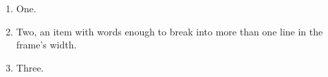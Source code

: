 \documentclass{beamer}
\begin{document}
\begin{frame}
\begin{enumerate}
\item One.
\item Two, an item with words enough to break into more than one line in the frame's width.
\item Three.
\end{enumerate}
\end{frame}
\end{document}
